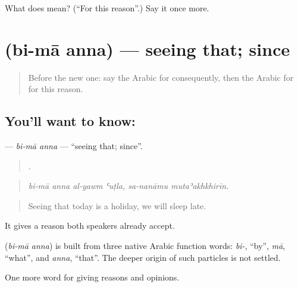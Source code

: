 \begin{tcolorbox}[breakable,colback=teal!4,colframe=teal!35!black,title={Before you move on}]
What does   mean? (\textquotedblleft{}For this reason\textquotedblright{}.) Say it once more.
\end{tcolorbox}
\section[\texorpdfstring{\ar{بما} \ar{أن} (bi-mā anna)}{بما أن (bi-mā anna)}]{  (bi-mā anna) — seeing that; since}

\label{lesson:AR-C374-bi-ma-anna}



\begin{quote}
Before the new one: say the Arabic for consequently, then the Arabic for for this reason.
\end{quote}

\subsection*{You'll want to know:  }
\textbf{ } — \emph{bi-mā anna} — \textquotedblleft{}seeing that; since\textquotedblright{}.

\begin{quote}
     .
\end{quote}

\begin{quote}
\emph{bi-mā anna al-yawm ʿuṭla, sa-nanāmu mutaʾakhkhirīn.}
\end{quote}

\begin{quote}
Seeing that today is a holiday, we will sleep late.
\end{quote}

It gives a reason both speakers already accept.

\begin{cousinweb}
\textbf{ } (\emph{bi-mā anna}) is built from three native Arabic function words: \emph{bi-}, \textquotedblleft{}by\textquotedblright{}, \emph{mā}, \textquotedblleft{}what\textquotedblright{}, and \emph{anna}, \textquotedblleft{}that\textquotedblright{}. The deeper origin of such particles is not settled.
\end{cousinweb}

\begin{grammarlens}[title={What you've built}]
One more word for giving reasons and opinions.
\end{grammarlens}


